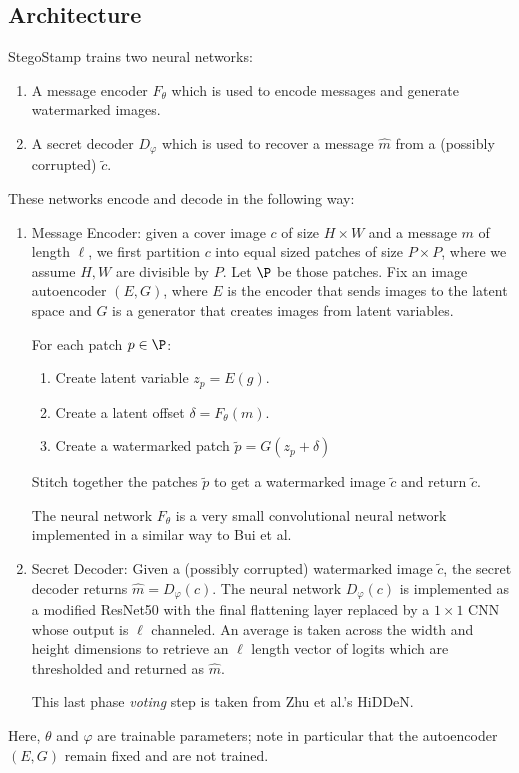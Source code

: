 \documentclass[twocolumn]{article}
\begin{document}
\subsection{Architecture}
StegoStamp trains two neural networks:
\begin{enumerate}[label=(\roman*)]
\item A message encoder $F_\theta$ which is used to encode messages and generate watermarked images.
\item A secret decoder $D_\varphi$ which is used to recover a message $\hat m$ from a (possibly corrupted) $\tilde c$.	
\end{enumerate}
These networks encode and decode in the following way:
\begin{enumerate}[label=(\roman*)]
\item Message Encoder: given a cover image $c$ of size $H\times W$ and a message $m$ of length $\ell$, we first partition $c$ into equal sized patches of size $P\times P$, where we assume $H, W$ are divisible by $P$. Let $\P$ be those patches. Fix an image autoencoder $(E, G)$, where $E$ is the encoder that sends images to the latent space and $G$ is a generator that creates images from latent variables.

For each patch $p\in \P$:
\begin{enumerate}[label=(\alph*)]
\item Create latent variable $z_p = E(g)$.
\item Create a latent offset $\delta = F_\theta(m)$.
\item Create a watermarked patch $\tilde p = G(z_p + \delta)$
\end{enumerate}
Stitch together the patches $\tilde p$ to get a watermarked image $\tilde c$ and return $\tilde c$.

The neural network $F_\theta$ is a very small convolutional neural network implemented in a similar way to Bui et al.
\item Secret Decoder: Given a (possibly corrupted) watermarked image $\tilde c$, the secret decoder returns $\hat m = D_\varphi(c)$. The neural network $D_\varphi(c)$ is implemented as a modified ResNet50 with the final flattening layer replaced by a $1\times 1$ CNN whose output is $\ell$ channeled. An average is taken across the width and height dimensions to retrieve an $\ell$ length vector of logits which are thresholded and returned as $\hat m$.

This last phase \textit{voting} step is taken from Zhu et al.'s HiDDeN.
\end{enumerate}
Here, $\theta$ and $\varphi$ are trainable parameters; note in particular that the autoencoder $(E, G)$ remain fixed and are not trained.
\end{document}

